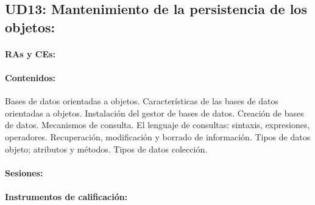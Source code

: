 \newpage
\subsection{UD13: Mantenimiento de la persistencia de los objetos:}

	\paragraph{RAs y CEs:}
	\paragraph{Contenidos:}
		Bases de datos orientadas a objetos.
		Características de las bases de datos orientadas a objetos.
		Instalación del gestor de bases de datos.
		Creación de bases de datos.
		Mecanismos de consulta.
		El lenguaje de consultas: sintaxis, expresiones, operadores.
		Recuperación, modificación y borrado de información.
		Tipos de datos objeto; atributos y métodos.
		Tipos de datos colección.
	\paragraph{Sesiones:}
	\paragraph{Instrumentos de calificación:}

